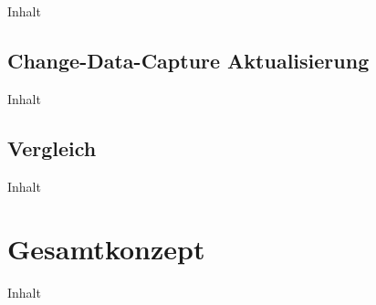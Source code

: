 Inhalt

\subsection{Change-Data-Capture Aktualisierung\label{subsec4.4.4:Unterunterpunkt-4}}

Inhalt

\subsection{Vergleich\label{subsec4.4.5:Unterunterpunkt-5}}

Inhalt

\section{Gesamtkonzept\label{sec4.5:Unterpunkt-5}}

Inhalt